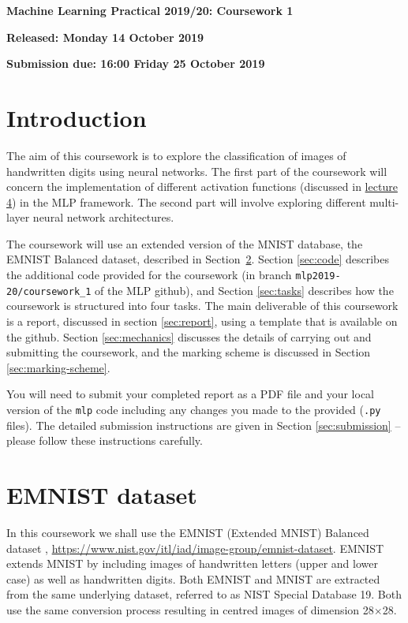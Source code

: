 \documentclass[11pt,]{article}
\begin{document}
\begin{center}
\textsf{\textbf{\Large Machine Learning Practical 2019/20: Coursework 1}}

\bigskip
\textbf{Released: Monday 14 October 2019}

\textbf{Submission due: 16:00 Friday 25 October 2019}
\end{center}
\section{Introduction}
\label{sec:introduction}

The aim of this coursework is to explore the classification of images of handwritten digits using neural networks. The first part of the coursework will concern the implementation of different activation functions (discussed in \href{http://www.inf.ed.ac.uk/teaching/courses/mlp/2019-20/lectures/mlp04-reg.pdf}{lecture 4}) in the MLP framework. The second part will involve exploring different multi-layer neural network architectures. 

The coursework will use an extended version of the MNIST database, the EMNIST Balanced dataset, described in Section~\ref{sec:emnist}.  Section \ref{sec:code} describes the additional code provided for the coursework (in branch \texttt{mlp2019-20/coursework\_1} of the MLP github), and Section \ref{sec:tasks} describes how the coursework is structured into four tasks.  The main deliverable of this coursework is a report, discussed in section \ref{sec:report}, using a template that is available on the github.  Section \ref{sec:mechanics} discusses the details of carrying out and submitting the coursework, and the marking scheme is discussed in Section \ref{sec:marking-scheme}.

You will need to submit your completed report as a PDF file  and your local version of the \texttt{mlp} code including any changes  you made to the provided (\texttt{.py} files).  The detailed submission instructions are given in Section \ref{sec:submission} -- please follow these instructions carefully.

\section{EMNIST dataset}
\label{sec:emnist}
In this coursework we shall use the  EMNIST  (Extended MNIST) Balanced dataset \citep{cohen2017emnist}, \url{https://www.nist.gov/itl/iad/image-group/emnist-dataset}.  EMNIST extends MNIST by including images of handwritten letters (upper and lower case) as well as handwritten digits. Both EMNIST and MNIST are extracted from the same underlying dataset, referred to as NIST Special Database 19.  Both use the same conversion process resulting in centred images of dimension 28$\times$28.  
\end{document}
